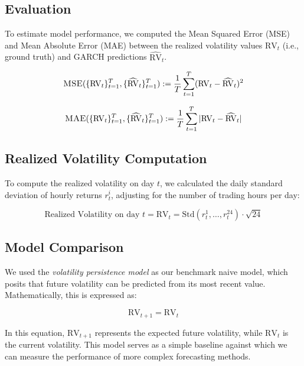 \subsection{Evaluation}
To estimate model performance, we computed the Mean Squared Error (MSE) and Mean Absolute Error (MAE) between the realized volatility values \(\text{RV}_t\) (i.e., ground truth) and GARCH predictions \(\widehat{\text{RV}}_t\).

\begin{equation}
    \textsc{MSE}(\{\text{RV}_t\}_{t=1}^T, \{\widehat{\text{RV}}_t\}_{t=1}^T) := \frac{1}{T}\sum_{t=1}^T (\text{RV}_t - \widehat{\text{RV}}_t)^2
\end{equation}

\begin{equation}
    \textsc{MAE}(\{\text{RV}_t\}_{t=1}^T, \{\widehat{\text{RV}}_t\}_{t=1}^T) := \frac{1}{T}\sum_{t=1}^T |\text{RV}_t - \widehat{\text{RV}}_t|
\end{equation}

\subsection{Realized Volatility Computation}
To compute the realized volatility on day \(t\), we calculated the daily standard deviation of hourly returns \(r_t^i\), adjusting for the number of trading hours per day:

\begin{equation}
    \text{Realized Volatility on day } t = \text{RV}_t = \text{Std}(r_t^1, \ldots, r_t^{24}) \cdot \sqrt{24}
\end{equation}

\subsection{Model Comparison}
We used the \textit{volatility persistence model} as our benchmark naive model, which posits that future volatility can be predicted from its most recent value. Mathematically, this is expressed as:

\begin{equation}
    \text{RV}_{t+1} = \text{RV}_{t}
\end{equation}

In this equation, \(\text{RV}_{t+1}\) represents the expected future volatility, while \(\text{RV}_{t}\) is the current volatility. This model serves as a simple baseline against which we can measure the performance of more complex forecasting methods.

